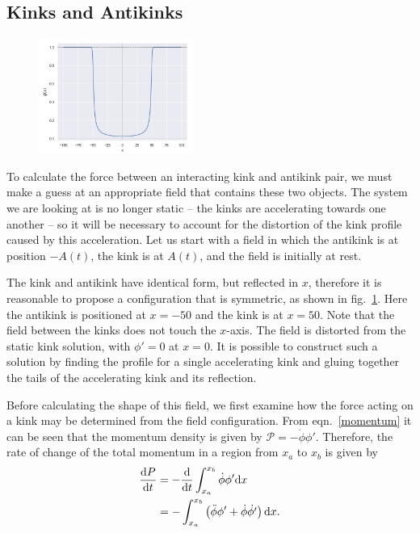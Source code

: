 \documentclass[11pt, oneside]{article}  	%
\numberwithin{equation}{section}
\newcommand{\drv}{\ensuremath{\textup{d}}}
\begin{document}
\subsection{Kinks and Antikinks}\label{kink-antikink-manton}
\begin{figure}[t]
    \vspace{-10pt}
    \centering
    \includegraphics[width=0.45\textwidth]{kink-kink_init.png}
     \label{kink_kink_state}
    \vspace{-10pt}
\end{figure} 
To calculate the force between an interacting kink and antikink pair, we must make a guess at an appropriate field that contains these two objects. The system we are looking at is no longer static -- the kinks are accelerating towards one another -- so it will be necessary to account for the distortion of the kink profile caused by this acceleration. Let us start with a field in which the antikink is at position $-A(t)$, the kink is at $A(t)$, and the field is initially at rest.\par
The kink and antikink have identical form, but reflected in $x$, therefore it is reasonable to propose a configuration that is symmetric, as shown in fig.~\ref{kink_kink_state}. Here the antikink is positioned at $x = -50$ and the kink is at $x= 50$. Note that the field between the kinks does not touch the $x$-axis. The field is distorted from the static kink solution, with $\phi' = 0$ at $x=0$. It is possible to construct such a solution by finding the profile for a single accelerating kink and gluing together the tails of the accelerating kink and its reflection.\par
Before calculating the shape of this field, we first examine how the force acting on a kink may be determined from the field configuration. From eqn.~\ref{momentum} it can be seen that the momentum density is given by $\mathcal{P} = -\dot{\phi}\phi'$. Therefore, the rate of change of the total momentum in a region from $x_a$ to $x_b$ is given by
\begin{align}
    \frac{\drv P}{\drv t} &= -\frac{\drv}{\drv t} \int_{x_a}^{x_b} \dot{\phi}\phi' \drv x \\
    &= - \int_{x_a}^{x_b} \left ( \ddot{\phi}\phi' + \dot{\phi}\dot{\phi'} \right )\drv x.
\end{align}
\end{document}
